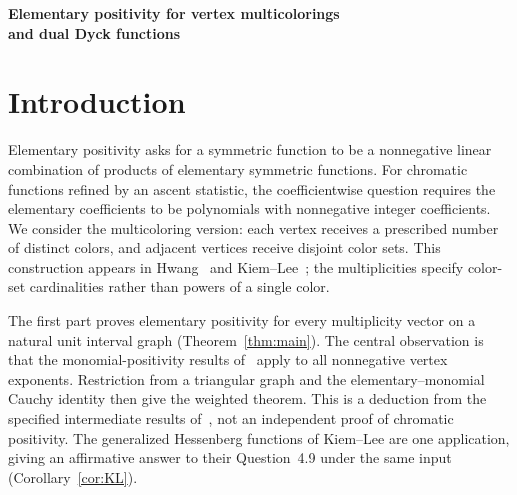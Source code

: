 \documentclass[11pt]{article}
\theoremstyle{remark}
\numberwithin{equation}{section}
\begin{document}
\begin{center}
  {\Large\bfseries Elementary positivity for vertex multicolorings\\
  and dual Dyck functions}\par
\end{center}

\begin{abstract}
We deduce coefficientwise elementary positivity for vertex multicolorings
of natural unit interval graphs from the intermediate monomial-positivity
results in OpenAI's chromatic-positivity preprint. A vertex of multiplicity
$a_i$ receives a set of $a_i$ distinct colors. Extracting arbitrary
nonnegative vertex exponents, rather than only squarefree exponents,
extends the chromatic argument to these multiplicities without division
by quantum factorials. This yields positivity for generalized Hessenberg
chromatic functions. In a second part, a direct correspondence between
step-$\tau$ dual Dyck factorizations and multicolorings proves elementary
positivity in each statistic degree for every integer $\tau\geq0$.
An explicit grading shift recovers Hawkes's original dual Dyck symmetric
functions at step one. All positivity conclusions use the stated external
input.
\end{abstract}

\section{Introduction}
Elementary positivity asks for a symmetric function to be a nonnegative
linear combination of products of elementary symmetric functions. For
chromatic functions refined by an ascent statistic, the coefficientwise
question requires the elementary coefficients to be polynomials with
nonnegative integer coefficients. We consider the multicoloring version:
each vertex receives a prescribed number of distinct colors, and adjacent
vertices receive disjoint color sets. This construction appears in
Hwang~\cite{Hwang} and Kiem--Lee~\cite{KL}; the multiplicities specify
color-set cardinalities rather than powers of a single color.

The first part proves elementary positivity for every multiplicity vector
on a natural unit interval graph (Theorem~\ref{thm:main}). The central
observation is that the monomial-positivity results of~\cite{OAI} apply to
all nonnegative vertex exponents. Restriction from a triangular graph and
the elementary--monomial Cauchy identity then give the weighted theorem.
This is a deduction from the specified intermediate results of~\cite{OAI},
not an independent proof of chromatic positivity. The generalized
Hessenberg functions of Kiem--Lee are one application, giving an
affirmative answer to their Question~4.9 under the same input
(Corollary~\ref{cor:KL}).
\end{document}
